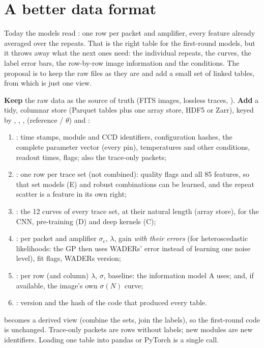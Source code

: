 \section{A better data format}
\label{sec:format}

\begin{basic}
Today the models read : one row per packet and amplifier, every feature already averaged over the repeats. That is
the right table for the first-round models, but it throws away what the next ones need: the individual repeats, the curves, the label
error bars, the row-by-row image information and the conditions. The proposal is to keep the raw files as they are and add a small set
of linked tables, from which  is just one view.
\end{basic}

\begin{advanced}
\textbf{Keep} the raw data as the source of truth (FITS images, lossless  traces, ). \textbf{Add} a tidy,
columnar store (Parquet tables plus one array store, HDF5 or Zarr), keyed by , , , 
(reference / $\theta$) and :
\begin{enumerate}
\item {}: time stamps, module and CCD identifiers, configuration hashes, the complete parameter vector (every pin),
  temperatures and other conditions, readout times, flags; also the trace-only packets;
\item {}: one row per trace set (not combined): quality flags and all 85 features, so that set models (E) and robust
  combinations can be learned, and the repeat scatter is a feature in its own right;
\item {}: the 12 curves of every trace set, at their natural length (array store), for the CNN, pre-training (D) and deep kernels (C);
\item {}: per packet and amplifier $\sigma_e$, $\lambda$, gain \emph{with their errors} (for heteroscedastic likelihoods: the GP
  then uses WADERs' error instead of learning one noise level), fit flags, WADERs version;
\item {}: per row (and column) $\lambda$, $\sigma$, baseline: the information model A uses; and, if available, the image's own
  $\sigma(N)$ curve;
\item {}: version and the hash of the code that produced every table.
\end{enumerate}
 becomes a derived view (combine the sets, join the labels), so the first-round code is unchanged. Trace-only packets
are rows without labels; new modules are new identifiers. Loading one table into pandas or PyTorch is a single call.
\end{advanced}

